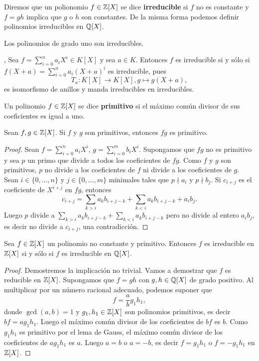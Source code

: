 Diremos que un polionomio $f\in\mathbb{Z}[X]$ se dice \textbf{irreducible} si $f$ no es constante 
y $f=gh$ implica que $g$ o $h$ son constantes. 
De la misma forma podemos definir polinomios irreducibles 
en $\mathbb{Q}[X]$. 

Los polinomios de grado uno son irreducibles. 

\begin{example}
\label{exa:traslacion}, 
    Sea $f=\sum_{i=0}^na_iX^i\in K[X]$ y sea $a\in K$. Entonces $f$ es 
    irreducible si y sólo si $f(X+a)=\sum_{i=0}^na_i(X+a)^i$ es irreducible, pues
    \[
    T_a\colon K[X]\to K[X],g\mapsto g(X+a),
    \]
    es isomorfismo de anillos y manda irreducibles en irreducibles. 
\end{example}

Un polinomio $f\in\mathbb{Z}[X]$ se dice \textbf{primitivo} si 
el máximo común divisor de sus coeficientes es igual a uno. 

\begin{lemma}[Gauss]
Sean $f,g\in\mathbb{Z}[X]$. Si $f$ y $g$ son primitivos, entonces $fg$ es primitivo.
\end{lemma}

\begin{proof}
Sean $f=\sum_{i=0}^na_iX^i$, $g=\sum_{i=0}^mb_iX^i$. Supongamos que $fg$ no es primitivo y sea $p$ un primo que
divide a todos los coeficientes de $fg$. Como $f$ y $g$ son primitivos, $p$ no 
divide a los coeficientes de $f$ ni divide a los coeficientes de $g$. Sean $i\in\{0,\dots,n\}$ 
y $j\in\{0,\dots,m\}$ minimales tales que $p\nmid a_i$ y $p\nmid b_j$. Si $c_{i+j}$ es el coeficiente de $X^{i+j}$ en $fg$, 
entonces
\[
c_{i+j}=\sum_{k>i}a_kb_{i+j-k}+\sum_{k<i}a_kb_{i+j-k}+a_ib_j.
\]
Luego $p$ divide a $\sum_{k>i}a_kb_{i+j-k}+\sum_{k<i}a_kb_{i+j-k}$ pero no divide al 
entero $a_ib_j$, es decir no divide a $c_{i+j}$, una contradicción.
\end{proof}

\begin{theorem}[Gauss]
Sea $f\in\mathbb{Z}[X]$ un polinomio no constante y primitivo. Entonces $f$ es 
irreducible en $\mathbb{Z}[X]$ si y sólo si $f$ es irreducible en $\mathbb{Q}[X]$. 
\end{theorem}

\begin{proof}
Demostremos la implicación no trivial. Vamos a demostrar que $f$ es reducible en 
$\mathbb{Z}[X]$. Supongamos que $f=gh$ con $g,h\in\mathbb{Q}[X]$ de grado positivo. Al multiplicar 
por un número racional adecuado, podemos suponer que
\[
f=\frac{a}{b}g_1h_1,
\]
donde $\gcd(a,b)=1$ y $g_1,h_1\in\mathbb{Z}[X]$ son polinomios primitivos, es decir $bf=ag_1h_1$. Luego
el máximo común divisor de los coeficientes de $bf$ es $b$. Como $g_1h_1$ es primitivo por el lema de Gauss, 
el máximo común divisor de los coeficientes de $ag_1h_1$ es $a$. Luego $a=b$ o $a=-b$, 
es decir $f=g_1h_1$ o $f=-g_1h_1$ en $\mathbb{Z}[X]$. 
\end{proof}

